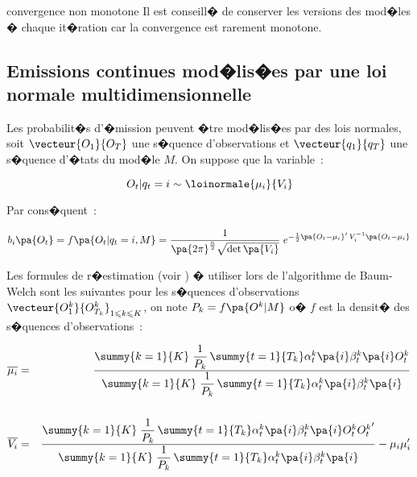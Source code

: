 \begin{xremark}{convergence non monotone}
Il est conseill� de conserver les versions des mod�les � chaque it�ration car la convergence est rarement monotone.
\end{xremark}










\subsection{Emissions continues mod�lis�es par une loi normale multidimensionnelle}
\label{hmm_loi_normale_emission_section}
%
%

Les probabilit�s d'�mission peuvent �tre mod�lis�es par des lois normales, soit $\vecteur{O_1}{O_T}$ une s�quence d'observations et $\vecteur{q_1}{q_T}$ une s�quence d'�tats du mod�le $M$. On suppose que la variable~:

        $$
        O_t | q_t = i \sim \loinormale{\mu_i}{V_i}
        $$
        
Par cons�quent~:

        $$
        b_i\pa{O_t} = f\pa{O_t | q_t = i,M} = \dfrac{1}{\pa{2\pi}^{\frac{n}{2}} \sqrt{ \det \pa{ V_i}} }
                                \; e ^{ - \frac{1}{2} \pa{O_t - \mu_i}' \,  V_i^{-1} \pa{O_t - \mu_i}             }
        $$

Les formules de r�estimation (voir ) � utiliser lors de l'algorithme de Baum-Welch sont les suivantes pour les s�quences d'observations $\vecteur{O^k_1}{O^k_{T_k}}_{1 \leqslant k \leqslant K}$, on note $P_k = f\pa{O^k|M}$ o� $f$ est la densit� des s�quences d'observations~:%

%

        \begin{eqnarray}
        \overline {\mu_{i}} &=& \dfrac      {   \summy{k=1}{K} \; \dfrac{1}{P_k} \,  
                                                                                        \summy{t=1}{T_k}  \alpha_t^k\pa{i} \beta_t^k\pa{i} O_t^k }
                                            {   \summy{k=1}{K} \; \dfrac{1}{P_k} \,  
                                                    \summy{t=1}{T_k}   \alpha_t^k\pa{i} \beta_t^k\pa{i}  } \\
        && \nonumber\\
        \overline {V_{i}} &=& \dfrac        {   \summy{k=1}{K} \; \dfrac{1}{P_k} \,  
                                                                                        \summy{t=1}{T_k}   \alpha_t^k\pa{i} \beta_t^k\pa{i} O_t^k {O_t^k}' }
                                            {   \summy{k=1}{K} \; \dfrac{1}{P_k} \,  
                                                    \summy{t=1}{T_k}   \alpha_t^k\pa{i} \beta_t^k\pa{i}  }
                            - \mu_i \mu'_i
        \end{eqnarray}

